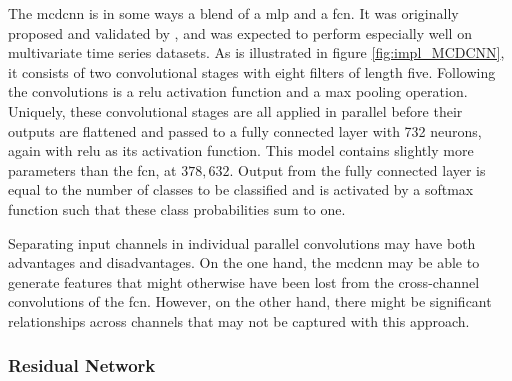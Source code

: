 The \acrfull{mcdcnn} is in some ways a blend of a \acrshort{mlp} and a \acrshort{fcn}. It was originally proposed and validated by \textcite{zheng2014}, and was expected to perform especially well on multivariate time series datasets. As is illustrated in figure \ref{fig:impl_MCDCNN}, it consists of two convolutional stages with eight filters of length five. Following the convolutions is a \acrshort{relu} activation function and a max pooling operation. Uniquely, these convolutional stages are all applied in parallel before their outputs are flattened and passed to a fully connected layer with 732 neurons, again with \acrshort{relu} as its activation function. This model contains slightly more parameters than the \acrshort{fcn}, at $378,632$. Output from the fully connected layer is equal to the number of classes to be classified and is activated by a softmax function such that these class probabilities sum to one.

Separating input channels in individual parallel convolutions may have both advantages and disadvantages. On the one hand, the \acrshort{mcdcnn} may be able to generate features that might otherwise have been lost from the cross-channel convolutions of the \acrshort{fcn}. However, on the other hand, there might be significant relationships across channels that may not be captured with this approach. 

\newpage
\subsubsection{Residual Network}

